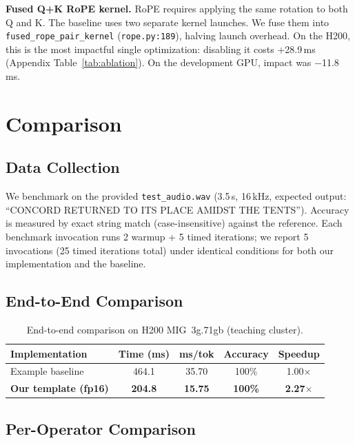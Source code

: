 \documentclass{article}
\begin{document}
\textbf{Fused Q+K RoPE kernel.}
RoPE requires applying the same rotation to both Q and K.  The baseline uses two separate kernel launches. We fuse them into \texttt{fused\_rope\_pair\_kernel} (\texttt{rope.py:189}), halving launch overhead.  On the H200, this is the most impactful single optimization: disabling it costs +28.9\,ms (Appendix Table~\ref{tab:ablation}). On the development GPU, impact was $-$11.8\,ms.


\section{Comparison}\label{sec:comparison}

\subsection{Data Collection}

We benchmark on the provided \texttt{test\_audio.wav} (3.5\,s, 16\,kHz, expected output: ``CONCORD RETURNED TO ITS PLACE AMIDST THE TENTS'').  Accuracy is measured by exact string match (case-insensitive) against the reference.  Each benchmark invocation runs 2 warmup + 5 timed iterations; we report 5 invocations (25 timed iterations total) under identical conditions for both our implementation and the baseline.

\subsection{End-to-End Comparison}

\begin{table}[h]
\centering
\caption{End-to-end comparison on H200 MIG~3g.71gb (teaching cluster).}
\label{tab:comparison}
\small
\begin{tabular}{@{}lcccc@{}}
\toprule
\textbf{Implementation} & \textbf{Time (ms)} & \textbf{ms/tok} & \textbf{Accuracy} & \textbf{Speedup} \\
\midrule
Example baseline & 464.1 & 35.70 & 100\% & 1.00$\times$ \\
\textbf{Our template (fp16)} & \textbf{204.8} & \textbf{15.75} & \textbf{100\%} & \textbf{2.27$\times$} \\
\bottomrule
\end{tabular}
\end{table}

\subsection{Per-Operator Comparison}
\end{document}
